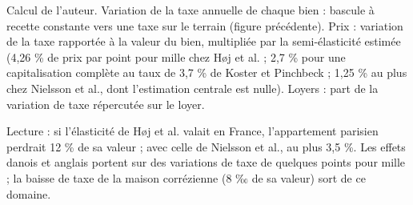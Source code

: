 Calcul de l'auteur. Variation de la taxe annuelle de chaque bien : bascule à recette constante vers une taxe sur le terrain (figure précédente). Prix : variation de la taxe rapportée à la valeur du bien, multipliée par la semi-élasticité estimée (4,26 \% de prix par point pour mille chez Høj et al. ; 2,7 \% pour une capitalisation complète au taux de 3,7 \% de Koster et Pinchbeck ; 1,25 \% au plus chez Nielsson et al., dont l'estimation centrale est nulle). Loyers : part de la variation de taxe répercutée sur le loyer.\par Lecture : si l'élasticité de Høj et al. valait en France, l'appartement parisien perdrait 12 \% de sa valeur ; avec celle de Nielsson et al., au plus 3,5 \%. Les effets danois et anglais portent sur des variations de taxe de quelques points pour mille ; la baisse de taxe de la maison corrézienne (8 ‰ de sa valeur) sort de ce domaine.
